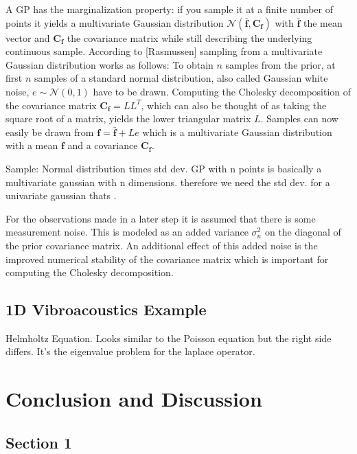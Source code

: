 \documentclass[%
  a4paper,oneside,%
  11pt,%
  smallchapters,
  green,%
  rgb, <cmyk>
  ,]{tubsbook}
\begin{document}
A GP has the marginalization property: if you sample it at a finite number of points it yields a multivariate Gaussian distribution $\mathcal{N}(\bar{\bm{f}},\bm{C_f})$ with $\bar{\bm{f}}$ the mean vector and $\bm{C_f}$ the covariance matrix while still describing the underlying continuous sample.
According to [Rasmussen] sampling from a multivariate Gaussian distribution works as follows: To obtain $n$ samples from the prior, at first $n$ samples of a standard normal distribution, also called Gaussian white noise, $e \sim \mathcal{N}(0,1)$ have to be drawn. Computing the Cholesky decomposition of the covariance matrix $\bm{C_f} = LL^T$, which can also be thought of as taking the square root of a matrix, yields the lower triangular matrix $L$. Samples can now easily be drawn from $\bm{f} = \bar{\bm{f}} + Le$ which is a multivariate Gaussian distribution with a mean $\bm{f}$ and a covariance $\bm{C_f}$.

Sample: Normal distribution times std dev. GP with n points is basically a multivariate gaussian with n dimensions. therefore we need the std dev. for a univariate gaussian thats . 

For the observations made in a later step it is assumed that there is some measurement noise. This is modeled as an added variance $\sigma_{n}^2$ on the diagonal of the prior covariance matrix. An additional effect of this added noise is the improved numerical stability of the covariance matrix which is important for computing the Cholesky decomposition.

\section{1D Vibroacoustics Example}
Helmholtz Equation. Looks similar to the Poisson equation but the right side differs. It's the eigenvalue problem for the laplace operator.

\lipsum[2-5] %



\chapter{Conclusion and Discussion}

\lipsum[1-3] %

\section{Section 1}
\end{document}

